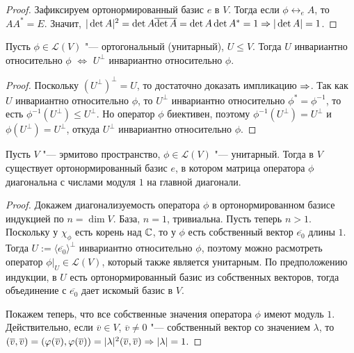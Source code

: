 \begin{proof}
	Зафиксируем ортонормированный базис $e$ в $V$. Тогда если $\phi \leftrightarrow_e A$, то $AA^* = E$. Значит, $|\det{A}|^2 \hm{=} \det{A}\overline{\det{A}} = \det{A}\det{A^*} = 1 \ra |\det{A}| = 1$.
\end{proof}

\begin{proposition}
	Пусть $\phi\in \mathcal{L}(V)$ "--- ортогональный (унитарный), $U \le V$. Тогда $U$ инвариантно относительно $\phi$ $\Leftrightarrow$ $U^\perp$ инвариантно относительно $\phi$.
\end{proposition}

\begin{proof}
	Поскольку $(U^\perp)^\perp = U$, то достаточно доказать импликацию $\Rightarrow$. Так как $U$ инвариантно относительно $\phi$, то $U^\perp$ инвариантно относительно $\phi^* = \phi^{-1}$, то есть $\phi^{-1}(U^\perp) \le U^\perp$. Но оператор $\phi$ биективен, поэтому $\phi^{-1}(U^\perp) = U^\perp$ и $\phi(U^\perp) = U^\perp$, откуда $U^\perp$ инвариантно относительно $\phi$.
\end{proof}

\begin{theorem}
	Пусть $V$ "--- эрмитово пространство, $\phi \in \mathcal{L}(V)$ "--- унитарный. Тогда в $V$ существует ортонормированный базис $e$, в котором матрица оператора $\phi$ диагональна с числами модуля $1$ на главной диагонали.
\end{theorem}

\begin{proof}
	Докажем диагонализуемость оператора $\phi$ в ортонормированном базисе индукцией по $n = \dim{V}$. База, $n = 1$, тривиальна. Пусть теперь $n > 1$. Поскольку у $\chi_\phi$ есть корень над $\mathbb{C}$, то у $\phi$ есть собственный вектор $\overline{e_0}$ длины $1$. Тогда $U := \langle\overline{e_0}\rangle^\perp$ инвариантно относительно $\phi$, поэтому можно расмотреть оператор $\phi|_{U} \in \mathcal{L}(V)$, который также является унитарным. \pagebreak По предположению индукции, в $U$ есть ортонормированный базис из собственных векторов, тогда объединение с $\overline{e_0}$ дает искомый базис в $V$.
	
	Покажем теперь, что все собственные значения оператора $\phi$ имеют модуль $1$. Действительно, если $\overline{v} \in V$, $\overline{v} \ne 0$ "--- собственный вектор со значением $\lambda$, то $(\overline{v}, \overline{v}) = (\phi(\overline{v}), \phi(\overline{v})) \hm= |\lambda|^2(\overline{v}, \overline{v}) \Rightarrow |\lambda| = 1$.
\end{proof}

